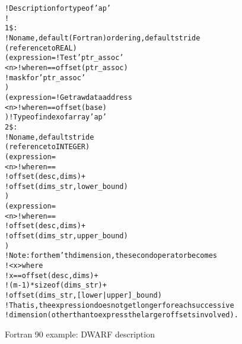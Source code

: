 \begin{figure}[h]
\begin{dwflisting}
\begin{alltt}
! Description for type of 'ap'
!
1\$: 
        ! No name, default (Fortran) ordering, default stride
        (reference to REAL)
        (expression= ! Test 'ptr\_assoc' 
            <n>    ! where n == offset(ptr\_assoc)
                  ! mask for 'ptr\_assoc' 
            )
        (expression= ! Get raw data address
            <n>    ! where n == offset(base)
            )    ! Type of index of array 'ap'
2\$:     
            ! No name, default stride
            (reference to INTEGER)
            (expression=
                <n> ! where n ==
                             !  offset(desc, dims) +
                             !  offset(dims\_str, lower\_bound)
                )
            (expression=
                <n> ! where n ==
                             !  offset(desc, dims) +
                             !  offset(dims\_str, upper\_bound)
                )
            !  Note: for the m'th dimension, the second operator becomes
            !  <x> where
            !       x == offset(desc, dims)          +
            !                (m-1)*sizeof(dims\_str) +
            !                 offset(dims\_str, [lower|upper]\_bound)
            !  That is, the expression does not get longer for each successive 
            !  dimension (other than to express the larger offsets involved).
\end{alltt}
\end{dwflisting}
\caption{Fortran 90 example: DWARF description}
\label{fig:fortran90exampledwarfdescription}
\end{figure}

